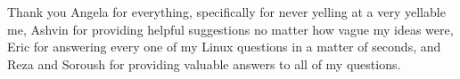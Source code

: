 \documentclass{ut-thesis}
\begin{document}
\begin{preliminary}



\begin{acknowledgements}
    Thank you Angela for everything, specifically for never yelling at a
    very yellable me, Ashvin for providing helpful suggestions no
    matter how vague my ideas were, Eric for answering every one of my
    Linux questions in a matter of seconds, and Reza and Soroush for providing
    valuable answers to all of my questions.

\end{acknowledgements}

\tableofcontents


\listoffigures


\end{preliminary}


\end{document}
